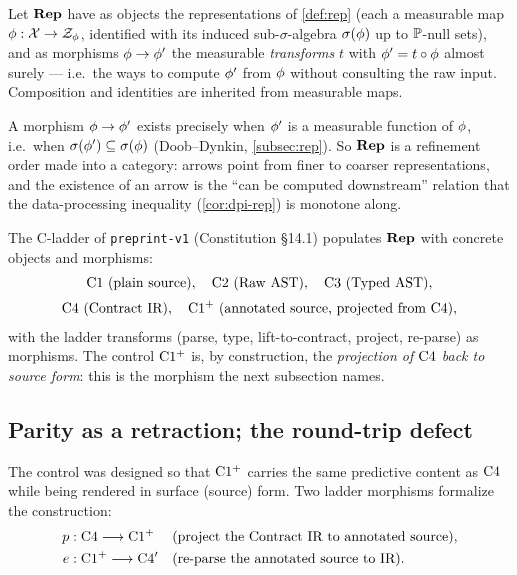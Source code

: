 \begin{definition}[$\catRep$]
\label{def:catrep}
Let $\catRep$ have as objects the representations of \cref{def:rep} (each a
measurable map $\phi:\mathcal{X}\to\mathcal{Z}_{\phi}$, identified with its induced
sub-$\sigma$-algebra $\sigma\!\left(\phi\right)$ up to $\mathbb{P}$-null sets), and as morphisms
$\phi\to\phi'$ the measurable \emph{transforms} $t$ with
$\phi' = t\circ\phi$ almost surely --- i.e.\ the ways to compute $\phi'$ from
$\phi$ without consulting the raw input. Composition and identities are
inherited from measurable maps.
\end{definition}

A morphism $\phi\to\phi'$ exists precisely when $\phi'$ is a measurable
function of $\phi$, i.e.\ when $\sigma\!\left(\phi'\right)\subseteq\sigma\!\left(\phi\right)$ (Doob--Dynkin,
\cref{subsec:rep}). So $\catRep$ is a refinement order made into a category:
arrows point from finer to coarser representations, and the existence of an
arrow is the ``can be computed downstream'' relation that the
data-processing inequality (\cref{cor:dpi-rep}) is monotone along.

The C-ladder of \texttt{preprint-v1} (Constitution §14.1) populates $\catRep$
with concrete objects and morphisms:
\[
  \begin{gathered}
  \mathrm{C}1\ \text{(plain source)},\quad
  \mathrm{C}2\ \text{(Raw AST)},\quad
  \mathrm{C}3\ \text{(Typed AST)},\\[2pt]
  \mathrm{C}4\ \text{(Contract IR)},\quad
  \mathrm{C1^{+}}\ \text{(annotated source, projected from }\mathrm{C}4\text{)},
  \end{gathered}
\]
with the ladder transforms (parse, type, lift-to-contract, project,
re-parse) as morphisms. The control $\mathrm{C1^{+}}$ is, by construction, the
\emph{projection of $\mathrm{C}4$ back to source form}: this is the morphism
the next subsection names.

\subsection{Parity as a retraction; the round-trip defect}
\label{subsec:retraction-parity}

The control was designed so that $\mathrm{C1^{+}}$ carries the same predictive
content as $\mathrm{C}4$ while being rendered in surface (source) form. Two
ladder morphisms formalize the construction:
\[
  \begin{aligned}
  p&:\mathrm{C}4\longrightarrow\mathrm{C1^{+}}
  &&(\text{project the Contract IR to annotated source}),\\
  e&:\mathrm{C1^{+}}\longrightarrow\mathrm{C}4'
  &&(\text{re-parse the annotated source to IR}).
  \end{aligned}
\]

